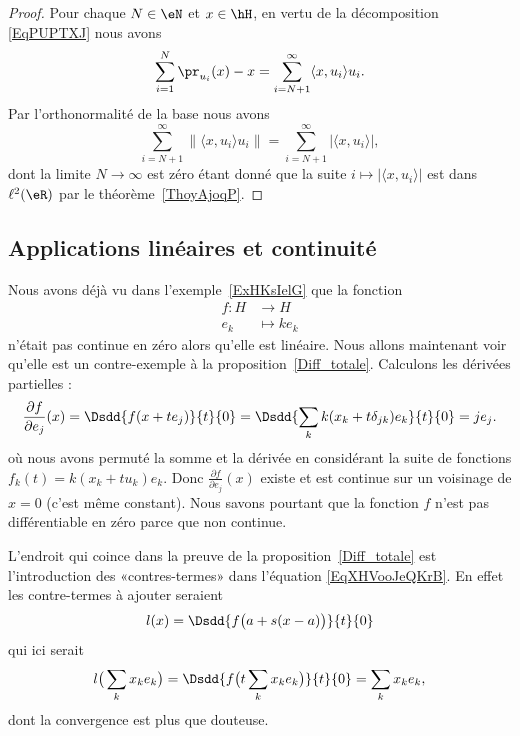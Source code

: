 \begin{proof}
	Pour chaque \( N\in \eN\) et \( x\in\hH\), en vertu de la décomposition \eqref{EqPUPTXJ} nous avons
	\begin{equation}
		\sum_{i=1}^N\pr_{u_i}(x)-x=\sum_{i=N+1}^{\infty}\langle x, u_i\rangle u_i.
	\end{equation}
	Par l'orthonormalité de la base nous avons
	\begin{equation}
		\sum_{i=N+1}^{\infty}\| \langle x, u_i\rangle u_i \|=\sum_{i=N+1}^{\infty}| \langle x, u_i\rangle  |,
	\end{equation}
	dont la limite \( N\to \infty\) est zéro étant donné que la suite \( i\mapsto| \langle x, u_i\rangle  |\) est dans \( \ell^2(\eR)\) par le théorème~\ref{ThoyAjoqP}.
\end{proof}

\subsection{Applications linéaires et continuité}

Nous avons déjà vu dans l'exemple~\ref{ExHKsIelG} que la fonction
\begin{equation}    \label{EqCJVooJOuXdN}
	\begin{aligned}
		f\colon H & \to H        \\
		e_k       & \mapsto ke_k
	\end{aligned}
\end{equation}
n'était pas continue en zéro alors qu'elle est linéaire. Nous allons maintenant voir qu'elle est un contre-exemple à la proposition~\ref{Diff_totale}. Calculons les dérivées partielles :
\begin{equation}
	\frac{ \partial f }{ \partial e_j }(x)=\Dsdd{ f(x+te_j) }{t}{0}=\Dsdd{ \sum_k k(x_k+t\delta_{jk})e_k }{t}{0}=je_j.
\end{equation}
où nous avons permuté la somme et la dérivée en considérant la suite de fonctions \( f_k(t)=k(x_k+tu_k)e_k\). Donc \( \frac{ \partial f }{ \partial e_j }(x)\) existe et est continue sur un voisinage de \( x=0\) (c'est même constant). Nous savons pourtant que la fonction \( f\) n'est pas différentiable en zéro parce que non continue.

L'endroit qui coince dans la preuve de la proposition~\ref{Diff_totale} est l'introduction des «contres-termes» dans l'équation \eqref{EqXHVooJeQKrB}. En effet les contre-termes à ajouter seraient
\begin{equation}
	l(x)=\Dsdd{ f\big( a+s(x-a) \big) }{t}{0}
\end{equation}
qui ici serait
\begin{equation}
	l\big( \sum_kx_ke_k \big)=\Dsdd{ f\big( t\sum_kx_ke_k \big) }{t}{0}=\sum_kx_ke_k,
\end{equation}
dont la convergence est plus que douteuse.

